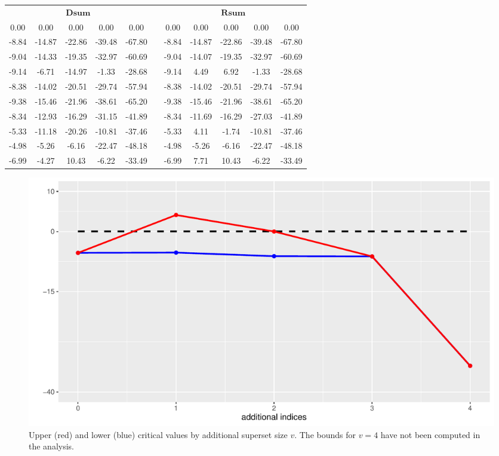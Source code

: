 \documentclass[11pt,a4paper,openright,twoside]{article}
\begin{document}
\begin{table}[h!]
\centering
\begin{tabular}{ccccccccccc}
\multicolumn{5}{c}{$\mathbf{Dsum}$} & & \multicolumn{5}{c}{$\mathbf{Rsum}$}\\
\cline{1-5} \cline{7-11}
0.00 & 0.00 & 0.00 & 0.00 & 0.00 &  & 0.00 & 0.00 & 0.00 & 0.00 & 0.00\\
-8.84 & -14.87 &-22.86 &-39.48 & -67.80 &  & -8.84 & -14.87 & -22.86 & -39.48 & -67.80\\
-9.04 & -14.33 & -19.35 & -32.97 & -60.69 &  & -9.04 & -14.07 & -19.35 & -32.97 & -60.69\\
-9.14 & -6.71 & -14.97 & -1.33 & -28.68 &  & -9.14 & 4.49 & 6.92 & -1.33 & -28.68\\
-8.38 & -14.02 & -20.51 & -29.74 & -57.94 &  & -8.38 & -14.02 & -20.51 & -29.74 & -57.94\\
-9.38 & -15.46 & -21.96 & -38.61 & -65.20 &  & -9.38 & -15.46 & -21.96 & -38.61 & -65.20\\
-8.34 & -12.93 & -16.29 & -31.15 & -41.89 &  & -8.34 & -11.69 & -16.29 & -27.03 & -41.89\\
-5.33 & -11.18 & -20.26 & -10.81 & -37.46 &  & -5.33 & 4.11 & -1.74 & -10.81 & -37.46\\
-4.98 & -5.26 & -6.16 & -22.47 & -48.18 &  & -4.98 & -5.26 & -6.16 & -22.47 & -48.18\\
-6.99 & -4.27 & 10.43 & -6.22 & -33.49 &  & -6.99 & 7.71 & 10.43 & -6.22 &-33.49
\end{tabular}
\end{table}

\vspace{2mm}

\begin{figure}[h!]
\centering
\includegraphics[scale=0.5]{example1.pdf}
\caption{Upper (red) and lower (blue) critical values by additional superset size $v$. The bounds for $v=4$ have not been computed in the analysis.}
\end{figure}
\end{document}
